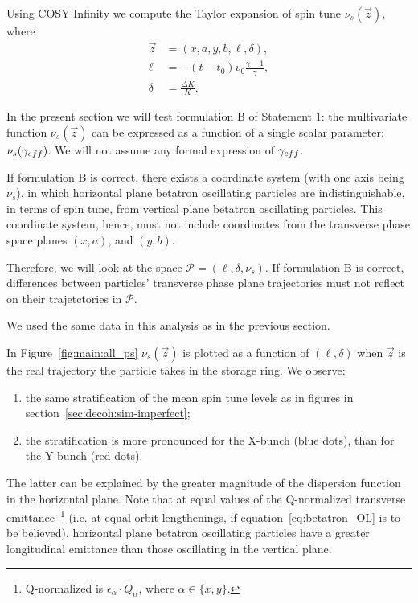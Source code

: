 \newcommand{\Ps}{\mathcal P}

Using COSY Infinity we compute the Taylor expansion of spin tune $\nu_s(\vec z)$, where
\begin{align*}
  \vec z &= (x,a,y,b,\ell,\delta), \\
  \ell &= -(t - t_0)v_0\frac{\gamma-1}{\gamma}, \\
  \delta &= \frac{\Delta K}{K}.
\end{align*}

In the present section we will test formulation B of Statement 1:
the multivariate function $\nu_s(\vec z)$ can be expressed as a function of a single scalar parameter:
$\nu_s(\g*)$. We will not assume any formal expression of $\g*$.

If formulation B is correct, there exists a coordinate system (with one axis being $\nu_s$),
in which horizontal plane betatron oscillating particles are indistinguishable, in terms of spin tune,
from vertical plane betatron oscillating particles. This coordinate system, hence, must not include
coordinates from the transverse phase space planes $(x,a)$, and $(y,b)$.

Therefore, we will look at the space $\Ps=(\ell, \delta, \nu_s)$. If formulation B is correct,
differences between particles' transverse phase plane trajectories must not reflect on their
trajetctories in $\Ps$.

We used the same data in this analysis as in the previous section.

In Figure~\ref{fig:main:all_ps} $\nu_s(\vec z)$ is plotted as a function of $(\ell, \delta)$ when
$\vec z$ is the real trajectory the particle takes in the storage ring. We observe:
\begin{enumerate}
\item the same stratification of the mean spin tune levels as in figures 
	in section~\ref{sec:decoh:sim-imperfect};
\item the stratification is more pronounced for the X-bunch (blue dots), than for the Y-bunch (red dots).
\end{enumerate}

The latter can be explained by the greater magnitude of the dispersion function in the horizontal plane.
Note that at equal values of the Q-normalized transverse emittance~\footnote{Q-normalized is $\epsilon_\alpha\cdot Q_\alpha$, where $\alpha\in\{x,y\}$.} (i.e. at equal orbit lengthenings, if equation~\eqref{eq:betatron_OL}
is to be believed), horizontal plane betatron oscillating particles have a greater longitudinal emittance than
those oscillating in the vertical plane.

